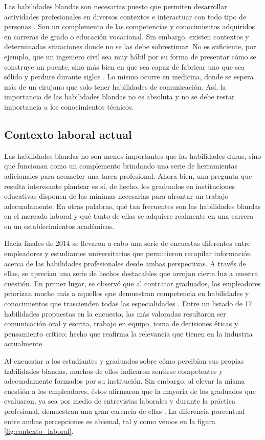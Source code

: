 \documentclass[conference]{IEEEtran}
\begin{document}
Las habilidades blandas son necesarias puesto que permiten desarrollar actividades profesionales en diversos contextos e interactuar con todo tipo de personas \cite{b7}. Son un complemento de las competencias y conocimientos adquiridos en carreras de grado o educación vocacional. Sin embargo, existen contextos y determinadas situaciones donde no se las debe sobrestimar. No es suficiente, por ejemplo, que un ingeniero civil sea muy hábil por su forma de presentar cómo se construye un puente, sino más bien en que sea capaz de fabricar uno que sea sólido y perdure durante siglos \cite{b3}. Lo mismo ocurre en medicina, donde se espera más de un cirujano que solo tener habilidades de comunicación. Así, la importancia de las habilidades blandas no es absoluta y no se debe restar importancia a los conocimientos técnicos.

\subsection{Contexto laboral actual}
\label{scrivauto:13}

Las habilidades blandas no son menos importantes que las habilidades duras, sino que funcionan como un complemento brindando una serie de herramientas adicionales para acometer una tarea profesional. Ahora bien, una pregunta que resulta interesante plantear es si, de hecho, los graduados en instituciones educativas disponen de las mínimas necesarias para afrontar un trabajo adecuadamente. En otras palabras, qué tan frecuentes son las habilidades blandas en el mercado laboral y qué tanto de ellas se adquiere realmente en una carrera en un establecimientos académicos.

Hacia finales de 2014 se llevaron a cabo una serie de encuestas diferentes entre empleadores y estudiantes universitarios que permitieron recopilar información acerca de las habilidades profesionales desde ambas perspectivas. A través de ellas, se aprecian una serie de hechos destacables que arrojan cierta luz a nuestra cuestión. En primer lugar, se observó que al contratar graduados, los empleadores priorizan mucho más a aquellos que demuestran competencia en habilidades y conocimientos que trascienden todas las especialidades \cite{b9}. Entre un listado de 17 habilidades propuestas en la encuesta, las más valoradas resultaron ser comunicación oral y escrita, trabajo en equipo, toma de decisiones éticas y pensamiento crítico; hecho que reafirma la relevancia que tienen en la industria actualmente.

Al encuestar a los estudiantes y graduados sobre cómo percibían sus propias habilidades blandas, muchos de ellos indicaron sentirse competentes y adecuadamente formados por su institución. Sin embargo, al elevar la misma cuestión a los empleadores, éstos afirmaron que la mayoría de los graduados que evaluaron, ya sea por medio de entrevistas laborales y durante la práctica profesional, demuestran una gran carencia de ellas \cite{b9}. La diferencia porcentual entre ambas percepciones es abismal, tal y como vemos en la figura \ref{fig:contexto_laboral}.
\end{document}
